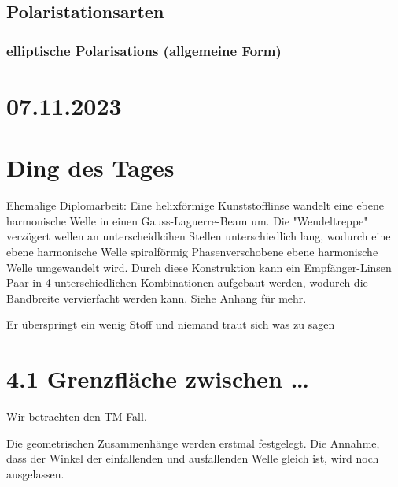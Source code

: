 \documentclass[a4paper]{article}
\begin{document}
\subsection*{Polaristationsarten}
\subsubsection*{elliptische Polarisations (allgemeine Form)}

\section*{07.11.2023}
\section*{Ding des Tages}
Ehemalige Diplomarbeit:\newline
Eine helixförmige Kunststofflinse wandelt eine ebene harmonische Welle in einen Gauss-Laguerre-Beam um. Die "Wendeltreppe" verzögert wellen an unterscheidlcihen Stellen unterschiedlich lang, wodurch eine ebene harmonische Welle spiralförmig Phasenverschobene ebene harmonische Welle umgewandelt wird.
Durch diese Konstruktion kann ein Empfänger-Linsen Paar in 4 unterschiedlichen Kombinationen aufgebaut werden, wodurch die Bandbreite vervierfacht werden kann. Siehe Anhang für mehr.

Er überspringt ein wenig Stoff und niemand traut sich was zu sagen
\section*{4.1 Grenzfläche  zwischen \ldots}
Wir betrachten den TM-Fall.

Die geometrischen Zusammenhänge werden erstmal festgelegt. Die Annahme, dass der Winkel der einfallenden und ausfallenden Welle gleich ist, wird noch ausgelassen.
\end{document}
